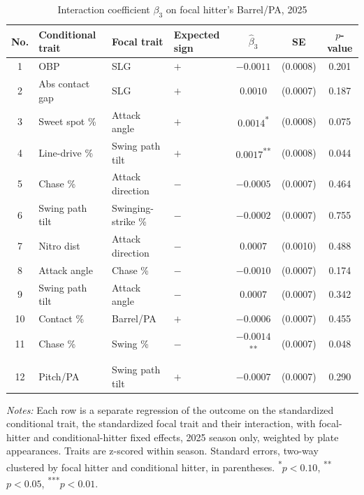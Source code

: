 \begin{table}[htbp]
\centering
\small
\caption{Interaction coefficient $\beta_3$ on focal hitter's Barrel/PA, 2025}
\label{tab:table1_barrel_2025}
\begin{tabular}{clllccc}
\toprule
No. & Conditional trait & Focal trait & Expected sign & $\hat\beta_3$ & SE & $p$-value \\
\midrule
1 & OBP & SLG & $+$ & $-0.0011$ & (0.0008) & 0.201 \\
2 & Abs contact gap & SLG & $+$ & $0.0010$ & (0.0007) & 0.187 \\
3 & Sweet spot \% & Attack angle & $+$ & $0.0014$\textsuperscript{*} & (0.0008) & 0.075 \\
4 & Line-drive \% & Swing path tilt & $+$ & $0.0017$\textsuperscript{**} & (0.0008) & 0.044 \\
5 & Chase \% & Attack direction & $-$ & $-0.0005$ & (0.0007) & 0.464 \\
6 & Swing path tilt & Swinging-strike \% & $-$ & $-0.0002$ & (0.0007) & 0.755 \\
7 & Nitro dist & Attack direction & $-$ & $0.0007$ & (0.0010) & 0.488 \\
8 & Attack angle & Chase \% & $-$ & $-0.0010$ & (0.0007) & 0.174 \\
9 & Swing path tilt & Attack angle & $-$ & $0.0007$ & (0.0007) & 0.342 \\
10 & Contact \% & Barrel/PA & $+$ & $-0.0006$ & (0.0007) & 0.455 \\
11 & Chase \% & Swing \% & $-$ & $-0.0014$\textsuperscript{**} & (0.0007) & 0.048 \\
12 & Pitch/PA & Swing path tilt & $+$ & $-0.0007$ & (0.0007) & 0.290 \\
\bottomrule
\end{tabular}
\par\smallskip\parbox{0.95\textwidth}{\footnotesize \textit{Notes:} Each row is a separate regression of the outcome on the standardized conditional trait, the standardized focal trait and their interaction, with focal-hitter and conditional-hitter fixed effects, 2025 season only, weighted by plate appearances. Traits are z-scored within season. Standard errors, two-way clustered by focal hitter and conditional hitter, in parentheses. \textsuperscript{*}$p<0.10$, \textsuperscript{**}$p<0.05$, \textsuperscript{***}$p<0.01$.}
\end{table}
